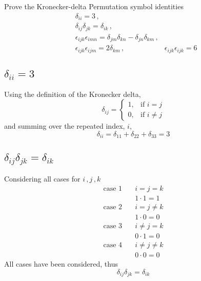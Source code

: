 \documentclass[12pt,letterpaper,boxed]{hmcpset}
\begin{document}

\begin{problem}[Exercise 1.1]
Prove the Kronecker-delta Permutation symbol identities
\begin{align*}
 &\delta_{ii}=3 \,, \\
 &\delta_{ij}\delta_{jk}=\delta_{ik}\,,\\
 &\epsilon_{ijk}\epsilon_{imn}=\delta_{jm}\delta_{kn}-\delta_{jn}\delta_{km}\,,\\
 &\epsilon_{ijk}\epsilon_{ijm}=2\delta_{km}\,,
 &\epsilon_{ijk}\epsilon_{ijk}=6
\end{align*}
\end{problem}

\begin{solution}
\subsection*{$\delta_{ii}=3$}
Using the definition of the Kronecker delta, 
\[
 \delta_{ij}=
\begin{cases} 
1,  & \mbox{if }i=j \\
0,  & \mbox{if }i\neq j
\end{cases}
\]
and summing over the repeated index, $i$,
\[
 \delta_{ii}=\delta_{11}+\delta_{22}+\delta_{33}=3
\]
\subsection*{$\delta_{ij}\delta_{jk}=\delta_{ik}$}
Considering all cases for $i\,,j\,,k$
\begin{align*}
\mbox{case 1}\quad&i=j=k \\
    &1\cdot 1=1\\
\mbox{case 2}\quad&i=j\neq k\\
    &1\cdot 0=0\\
\mbox{case 3}\quad&i\neq j=k\\
    &0\cdot 1=0\\
\mbox{case 4}\quad&i\neq j\neq k\\
    &0\cdot0=0
\end{align*}
All cases have been considered, thus
\[
 \delta_{ij}\delta_{jk}=\delta_{ik}
\]

\end{solution}
% 
\end{document}
